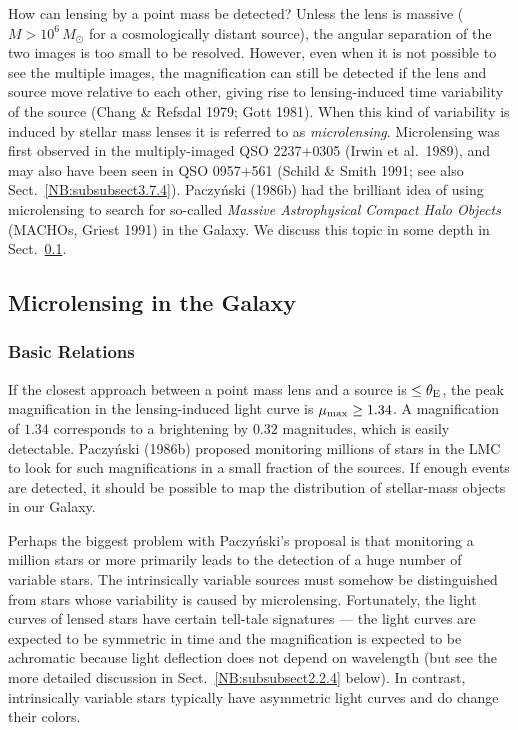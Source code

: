 \documentclass[a4paper,10pt]{article} %
\begin{document}
How can lensing by a point mass be detected? Unless the lens is
massive ($M>10^6\,M_\odot$ for a cosmologically distant source), the
angular separation of the two images is too small to be
resolved. However, even when it is not possible to see the multiple
images, the magnification can still be detected if the lens and source
move relative to each other, giving rise to lensing-induced time
variability of the source (Chang \& Refsdal 1979; Gott 1981). When
this kind of variability is induced by stellar mass lenses it is
referred to as {\em microlensing\/}. Microlensing was first observed
in the multiply-imaged QSO 2237$+$0305 (Irwin et al.\ 1989), and may
also have been seen in QSO 0957$+$561 (Schild \& Smith 1991; see also
Sect.\ \ref{NB:subsubsect3.7.4}). Paczy\'nski (1986b) had the
brilliant idea of using microlensing to search for so-called {\em
Massive Astrophysical Compact Halo Objects\/} (MACHOs, Griest 1991) in
the Galaxy. We discuss this topic in some depth in Sect.\
\ref{NB:subsect2.2}.

\subsection{Microlensing in the Galaxy}
\label{NB:subsect2.2}

\subsubsection{Basic Relations}
\label{NB:subsubsect2.2.1}

If the closest approach between a point mass lens and a source is
$\le\theta_{\rm E}$, the peak magnification in the lensing-induced
light curve is $\mu_{\rm max}\ge1.34$. A magnification of $1.34$
corresponds to a brightening by $0.32$ magnitudes, which is easily
detectable. Paczy\'nski (1986b) proposed monitoring millions of stars
in the LMC to look for such magnifications in a small fraction of the
sources. If enough events are detected, it should be possible to map
the distribution of stellar-mass objects in our Galaxy.

Perhaps the biggest problem with Paczy\'nski's proposal is that
monitoring a million stars or more primarily leads to the detection of
a huge number of variable stars. The intrinsically variable sources
must somehow be distinguished from stars whose variability is caused
by microlensing. Fortunately, the light curves of lensed stars have
certain tell-tale signatures --- the light curves are expected to be
symmetric in time and the magnification is expected to be achromatic
because light deflection does not depend on wavelength (but see the
more detailed discussion in Sect.\ \ref{NB:subsubsect2.2.4} below). In
contrast, intrinsically variable stars typically have asymmetric light
curves and do change their colors.
\end{document}
